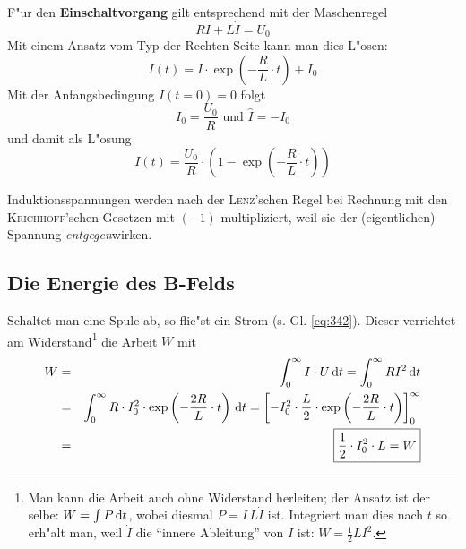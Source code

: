 \begin{Beispiel}
F"ur den \textbf{Einschaltvorgang} gilt entsprechend mit der
Maschenregel
\begin{equation*}
   RI + L\dot I = U_0
\end{equation*}
Mit einem Ansatz vom Typ der Rechten Seite kann man dies L"osen:
\begin{equation*}
   I(t) = \hat I \cdot \exp \left (- \frac{ R}{L} \cdot t \right ) + I_0
\end{equation*}
Mit der Anfangsbedingung $I(t = 0) = 0$ folgt
\begin{equation*}
   I_0 = \frac{U_0}{R} \text{ und } \hat I = - I_0
\end{equation*}
und damit als L"osung
\begin{equation}
   \label{eq:340}
   I(t) = \frac{U_0}{R} \cdot \left (1 -  \exp \left (- \frac{ R}{L} \cdot t
   \right ) \right )
\end{equation}
\end{Beispiel}

\begin{Wichtig}
Induktionsspannungen werden nach der \textsc{Lenz}'schen Regel bei
Rechnung mit den \textsc{Krichhoff}'schen Gesetzen mit $(-1)$
multipliziert, weil sie der (eigentlichen) Spannung \emph{entgegen}wirken.
\end{Wichtig}






\subsection{Die Energie des B-Felds}
\label{kap_energie-des-b-felds}



Schaltet man eine Spule ab, so flie"st ein Strom
(s. Gl. \eqref{eq:342}). Dieser verrichtet am Widerstand\footnote{Man
  kann die Arbeit auch ohne Widerstand herleiten; der Ansatz ist der
  selbe: $W = \int P \, \mathrm{d} t$, wobei diesmal $P = I \, L\dot I$
  ist. Integriert man dies nach $t$ so erh"alt man, weil $\dot I$ die
  "`innere Ableitung"' von $I$ ist: $W = \frac{1}{2}LI^2$.} die Arbeit
$W$ mit
\begin{eqnarray}
\nonumber
   W &=& \int_0^\infty I \cdot U \, \mathrm{d} t = \int_0^\infty R I^2 \, \mathrm{d} t
   \\
\nonumber
   &=& \int_0^\infty R \cdot I_0^2 \cdot \exp \left ( -\frac{2 R}{L}
      \cdot t \right ) \, \mathrm{d} t 
= \left [ -I_0^2 \cdot \frac{L}{2} \cdot \exp \left ( -\frac{2 R}{L}
      \cdot t \right ) \right ]_0^\infty\\
\label{eq:343}
&=&\boxed{ \frac{1}{2} \cdot I_0^2 \cdot L = W}
\end{eqnarray}


